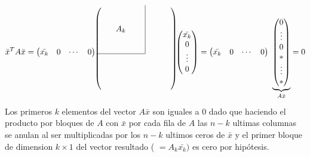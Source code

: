 \begin{itemize}
\begin{equation}
 \bar{x}^{T} A \bar{x} = \begin{pmatrix} \bar{x_{k}} & 0 & \cdots & 0 \end{pmatrix}
  \begin{blockarray}{ccccc|cccc}
    \begin{block}{(ccccc|cccc@{\hspace*{5pt}})}
	\BAmulticolumn{5}{c|}{\multirow{5}{*}{$A_{k}$}}&\BAmulticolumn{4}{c}{\multirow{5}{*}{}}\\
    &&&&&&&\\
    &&&&&&&\\
    &&&&&&&\\
    &&&&&&&\\
    \cline{1-5}%
    \BAmulticolumn{5}{c}{\multirow{4}{*}{}}&\BAmulticolumn{4}{c}{\multirow{4}{*}{}}\\
    \BAmulticolumn{5}{c}{\multirow{4}{*}{}}&\BAmulticolumn{4}{c}{\multirow{4}{*}{}}\\
    \BAmulticolumn{5}{c}{\multirow{4}{*}{}}&\BAmulticolumn{4}{c}{\multirow{4}{*}{}}\\
    \BAmulticolumn{5}{c}{\multirow{4}{*}{}}&\BAmulticolumn{4}{c}{\multirow{4}{*}{}}\\
    \end{block}
  \end{blockarray}
  \begin{pmatrix} \bar{x_{k}} \\ 0 \\ \vdots \\ 0 \end{pmatrix} =
  \begin{pmatrix} \bar{x_{k}} & 0 & \cdots & 0 \end{pmatrix}   \  \underbrace{\begin{pmatrix} 0 \\ \vdots \\ 0 \\ * \\ \vdots \\ * \end{pmatrix}}_{A \bar{x}} = 0
\end{equation}
Los primeros $k$ elementos del vector $A \bar{x}$ son iguales a $0$ dado que haciendo el producto por bloques de $A$ con $\bar{x}$ por cada fila de $A$ las $n-k$ ultimas columnas se anulan al ser multiplicadas por los $n-k$ ultimos ceros de $\bar{x}$ y el primer bloque de dimension $k \times 1$ del vector resultado ( $ = A_k \bar{x_{k}} )$ es cero por hipótesis.


\end{itemize}

